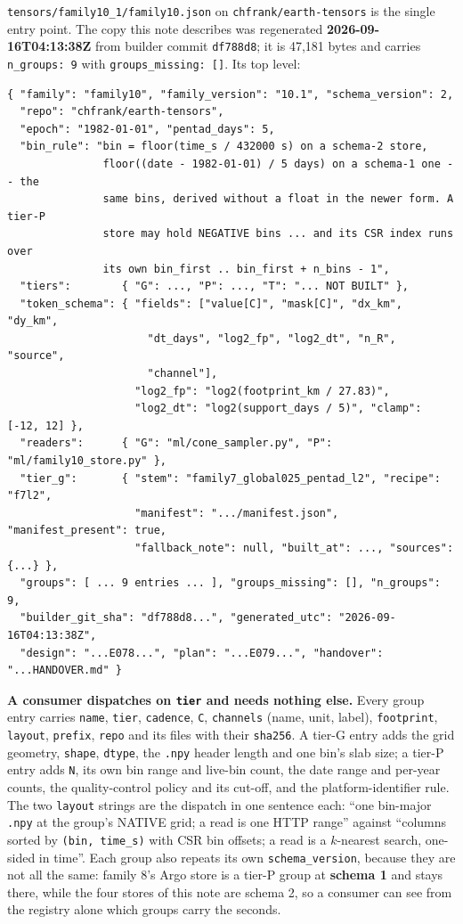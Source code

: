\documentclass[10pt]{article}
\newcommand{\code}[1]{\texttt{#1}}
\begin{document}
\code{tensors/family10\_1/family10.json} on \code{chfrank/earth-tensors} is the
single entry point. The copy this note describes was regenerated
\textbf{2026-09-16T04:13:38Z} from builder commit \code{df788d8}; it is 47,181
bytes and carries \code{n\_groups: 9} with \code{groups\_missing: []}. Its top
level:

\begin{verbatim}
{ "family": "family10", "family_version": "10.1", "schema_version": 2,
  "repo": "chfrank/earth-tensors",
  "epoch": "1982-01-01", "pentad_days": 5,
  "bin_rule": "bin = floor(time_s / 432000 s) on a schema-2 store,
               floor((date - 1982-01-01) / 5 days) on a schema-1 one -- the
               same bins, derived without a float in the newer form. A tier-P
               store may hold NEGATIVE bins ... and its CSR index runs over
               its own bin_first .. bin_first + n_bins - 1",
  "tiers":        { "G": ..., "P": ..., "T": "... NOT BUILT" },
  "token_schema": { "fields": ["value[C]", "mask[C]", "dx_km", "dy_km",
                      "dt_days", "log2_fp", "log2_dt", "n_R", "source",
                      "channel"],
                    "log2_fp": "log2(footprint_km / 27.83)",
                    "log2_dt": "log2(support_days / 5)", "clamp": [-12, 12] },
  "readers":      { "G": "ml/cone_sampler.py", "P": "ml/family10_store.py" },
  "tier_g":       { "stem": "family7_global025_pentad_l2", "recipe": "f7l2",
                    "manifest": ".../manifest.json", "manifest_present": true,
                    "fallback_note": null, "built_at": ..., "sources": {...} },
  "groups": [ ... 9 entries ... ], "groups_missing": [], "n_groups": 9,
  "builder_git_sha": "df788d8...", "generated_utc": "2026-09-16T04:13:38Z",
  "design": "...E078...", "plan": "...E079...", "handover": "...HANDOVER.md" }
\end{verbatim}

\noindent\textbf{A consumer dispatches on \code{tier} and needs nothing else.}
Every group entry carries \code{name}, \code{tier}, \code{cadence}, \code{C},
\code{channels} (name, unit, label), \code{footprint}, \code{layout},
\code{prefix}, \code{repo} and its files with their \code{sha256}. A tier-G
entry adds the grid geometry, \code{shape}, \code{dtype}, the \code{.npy}
header length and one bin's slab size; a tier-P entry adds \code{N}, its own bin
range and live-bin count, the date range and per-year counts, the
quality-control policy and its cut-off, and the platform-identifier rule. The
two \code{layout} strings are the dispatch in one sentence each: ``one bin-major
\code{.npy} at the group's NATIVE grid; a read is one HTTP range'' against
``columns sorted by \code{(bin, time\_s)} with CSR bin offsets; a read is a
$k$-nearest search, one-sided in time''. Each group also repeats its own
\code{schema\_version}, because they are not all the same: family 8's Argo
store is a tier-P group at \textbf{schema 1} and stays there, while the four
stores of this note are schema 2, so a consumer can see from the registry alone
which groups carry the seconds.
\end{document}
